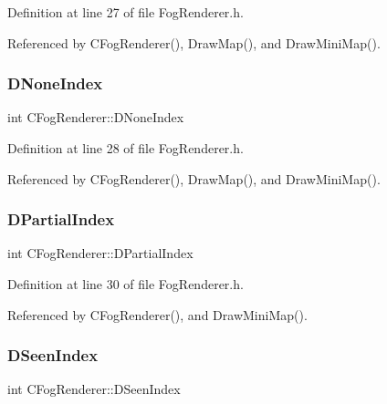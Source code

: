Definition at line 27 of file Fog\+Renderer.\+h.



Referenced by C\+Fog\+Renderer(), Draw\+Map(), and Draw\+Mini\+Map().

\hypertarget{classCFogRenderer_ac4731c0fcb7e73be9fd6839659e519ba}{}\label{classCFogRenderer_ac4731c0fcb7e73be9fd6839659e519ba} 
\subsubsection{\texorpdfstring{D\+None\+Index}{DNoneIndex}}
{\footnotesize\ttfamily int C\+Fog\+Renderer\+::\+D\+None\+Index\hspace{0.3cm}{\ttfamily [protected]}}



Definition at line 28 of file Fog\+Renderer.\+h.



Referenced by C\+Fog\+Renderer(), Draw\+Map(), and Draw\+Mini\+Map().

\hypertarget{classCFogRenderer_aa445569ee9f7ede85d5c2cd4fd9d6fca}{}\label{classCFogRenderer_aa445569ee9f7ede85d5c2cd4fd9d6fca} 
\subsubsection{\texorpdfstring{D\+Partial\+Index}{DPartialIndex}}
{\footnotesize\ttfamily int C\+Fog\+Renderer\+::\+D\+Partial\+Index\hspace{0.3cm}{\ttfamily [protected]}}



Definition at line 30 of file Fog\+Renderer.\+h.



Referenced by C\+Fog\+Renderer(), and Draw\+Mini\+Map().

\hypertarget{classCFogRenderer_acac9ab2c0a8023661ab1aa096d713458}{}\label{classCFogRenderer_acac9ab2c0a8023661ab1aa096d713458} 
\subsubsection{\texorpdfstring{D\+Seen\+Index}{DSeenIndex}}
{\footnotesize\ttfamily int C\+Fog\+Renderer\+::\+D\+Seen\+Index\hspace{0.3cm}{\ttfamily [protected]}}



